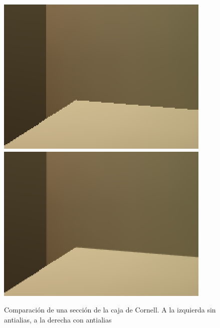 \documentclass[letterpaper]{article}
\begin{document}
\begin{figure}[htbp]
  \centering
  \includegraphics{img/alias}
  \hspace{2em}
  \includegraphics{img/antialias}
  \caption{Comparación de una sección de la caja de Cornell. A la
    izquierda sin antialias, a la derecha con antialias}
\end{figure}



\end{document}
